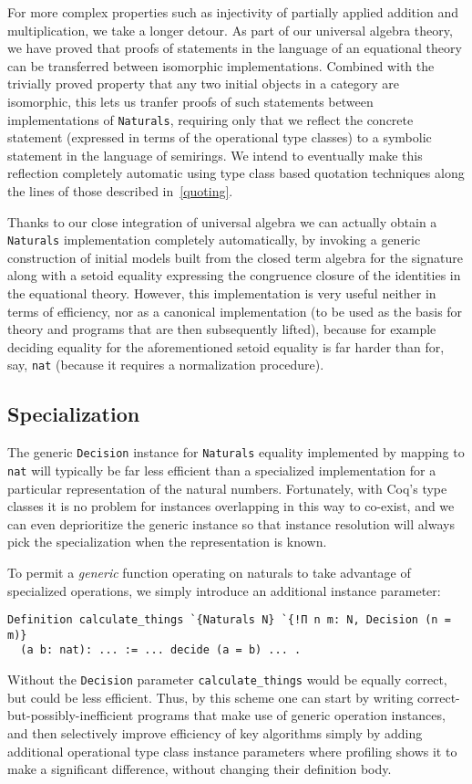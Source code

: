 \documentclass[a4paper,10pt,runningheads]{llncs}
\begin{document}
For more complex properties such as injectivity of partially applied addition and multiplication, we take a longer detour. As part of our universal algebra theory, we have proved that proofs of statements in the language of an equational theory can be transferred between isomorphic implementations. Combined with the trivially proved property that any two initial objects in a category are isomorphic, this lets us tranfer proofs of such statements between implementations of \lstinline|Naturals|, requiring only that we reflect the concrete statement (expressed in terms of the operational type classes) to a symbolic statement in the language of semirings. We intend to eventually make this reflection completely automatic using type class based quotation techniques along the lines of those described in~\ref{quoting}.

Thanks to our close integration of universal algebra we can actually obtain a \lstinline|Naturals| implementation completely automatically, by invoking a generic construction of initial models built from the closed term algebra for the signature along with a setoid equality expressing the congruence closure of the identities in the equational theory. However, this implementation is very useful neither in terms of efficiency, nor as a canonical implementation (to be used as the basis for theory and programs that are then subsequently lifted), because for example deciding equality for the aforementioned setoid equality is far harder than for, say, \lstinline|nat| (because it requires a normalization procedure).

\subsection{Specialization}

The generic \lstinline|Decision| instance for \lstinline|Naturals| equality implemented by mapping to \lstinline|nat| will typically be far less efficient than a specialized implementation for a particular representation of the natural numbers. Fortunately, with Coq's type classes it is no problem for instances overlapping in this way to co-exist, and we can even deprioritize the generic instance so that instance resolution will always pick the specialization when the representation is known.

To permit a \emph{generic} function operating on naturals to take advantage of specialized operations, we simply introduce an additional instance parameter:
\begin{lstlisting}
Definition calculate_things `{Naturals N} `{!Π n m: N, Decision (n = m)}
  (a b: nat): ... := ... decide (a = b) ... .
\end{lstlisting}
Without the \lstinline|Decision| parameter \lstinline|calculate_things| would be equally correct, but could be less efficient. Thus, by this scheme one can start by writing correct-but-possibly-inefficient programs that make use of generic operation instances, and then selectively improve efficiency of key algorithms simply by adding additional operational type class instance parameters where profiling shows it to make a significant difference, without changing their definition body.
\end{document}
